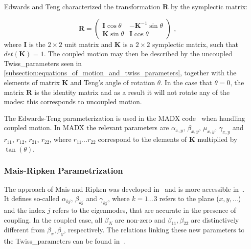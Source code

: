 Edwards and Teng characterized the transformation \(\mathbf{R}\) by the symplectic matrix:

\begin{equation}
    \mathbf{R} =\left(
        \begin{array}{cc}
            \mathbf{I} \cos \theta & -\mathbf{K}^{-1} \sin \theta \\
            \mathbf{K} \sin \theta & \mathbf{I} \cos \theta
    \end{array} \right) \text{ ,}
    \label{equation:edwards_teng_rotation_matrix}
\end{equation}
where \(\mathbf{I}\) is the \(2 \times 2\) unit matrix and \(\mathbf{K}\) is a \(2 \times 2\) symplectic matrix, such that \(det(\mathbf{K}) = 1\).
The coupled motion may then be described by the uncoupled \gls{Twiss_parameters} seen in \cref{subsection:equations_of_motion_and_twiss_parameters}, together with the elements of matrix \(\mathbf{K}\) and Teng's angle of rotation \(\theta\).
In the case that \(\theta = 0\), the matrix \(\mathbf{R}\) is the identity matrix and as a result it will not rotate any of the modes: this corresponds to uncoupled motion.

The Edwards-Teng parameterization is used in the \gls{MADX} code~\cite{CODE:MADX_guide} when handling coupled motion.
In \gls{MADX} the relevant parameters are \(\alpha_{x, y}\), \(\beta_{x, y}\), \(\mu_{x, y}\), \(\gamma_{x, y}\) and \(r_{11}\), \(r_{12}\), \(r_{21}\), \(r_{22}\), where \(r_{11} \ldots r_{22}\) correspond to the elements of \(\mathbf{K}\) multiplied by \(\tan(\theta)\).

\subsubsection*{Mais-Ripken Parametrization}

The approach of Mais and Ripken was developed in~\cite{REPORT:Ripken:AllGerman} and is more accessible in~\cite{AIP:Willeke:Methods_Beam_Optics, REPORT:Borchardt:Calculation_Beam_Envelopes}.
It defines so-called  \(\alpha_{kj}\), \(\beta_{kj}\) and \(\gamma_{kj}\), where \(k = 1 \ldots 3\) refers to the plane (\(x, y, \ldots\)) and the index \(j\) refers to the eigenmodes, that are accurate in the presence of coupling.
In the coupled case, all \(\beta_N\) are non-zero and \(\beta_{11}, \beta_{22}\) are distinctively different from \(\beta_x, \beta_y\), respectively.
The relations linking these new parameters to the \gls{Twiss_parameters} can be found in~\cite{IOP:Lebedev:Betatron_Motion_Coupling}.

